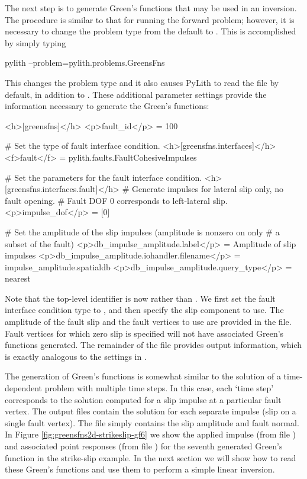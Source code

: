 The next step is to generate Green's functions that may be used in
an inversion. The procedure is similar to that for running the forward
problem; however, it is necessary to change the problem type from
the default  to . This is
accomplished by simply typing
\begin{shell}
pylith --problem=pylith.problems.GreensFns
\end{shell}
This changes the problem type and it also causes PyLith to read the
file  by default, in addition to .
These additional parameter settings provide the information necessary
to generate the Green's functions:
\begin{cfg}
<h>[greensfns]</h>
<p>fault_id</p> = 100

# Set the type of fault interface condition.
<h>[greensfns.interfaces]</h>
<f>fault</f> = pylith.faults.FaultCohesiveImpulses

# Set the parameters for the fault interface condition.
<h>[greensfns.interfaces.fault]</h>
# Generate impulses for lateral slip only, no fault opening.
# Fault DOF 0 corresponds to left-lateral slip.
<p>impulse_dof</p> = [0]

# Set the amplitude of the slip impulses (amplitude is nonzero on only
# a subset of the fault)
<p>db_impulse_amplitude.label</p> = Amplitude of slip impulses
<p>db_impulse_amplitude.iohandler.filename</p> = impulse_amplitude.spatialdb
<p>db_impulse_amplitude.query_type</p> = nearest
\end{cfg}
Note that the top-level identifier is now  rather
than . We first set the fault interface condition
type to , and then specify the slip
component to use. The amplitude of the fault slip and the fault
vertices to use are provided in the
 file.  Fault vertices for
which zero slip is specified will not have associated Green's
functions generated. The remainder of the 
file provides output information, which is exactly analogous to the
settings in .

The generation of Green's functions is somewhat similar to the
solution of a time-dependent problem with multiple time steps. In this
case, each `time step' corresponds to the solution computed for a slip
impulse at a particular fault vertex. The output files contain the
solution for each separate impulse (slip on a single fault
vertex). The  file simply contains
the slip amplitude and fault normal. In Figure
\vref{fig:greensfns2d-strikeslip-gf6} we show the applied impulse
(from file ) and associated point
responses (from file ) for the seventh
generated Green's function in the strike-slip example. In the next
section we will show how to read these Green's functions and use them
to perform a simple linear inversion.

